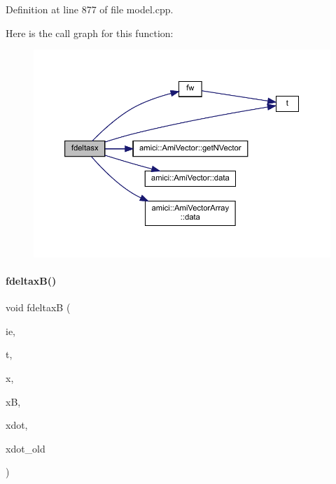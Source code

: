 Definition at line 877 of file model.\+cpp.

Here is the call graph for this function\+:
\nopagebreak
\begin{figure}[H]
\begin{center}
\leavevmode
\includegraphics[width=350pt]{classamici_1_1_model_a685b7374d29d96f7d40d83c7d92fcf27_cgraph}
\end{center}
\end{figure}
\mbox{\label{classamici_1_1_model_a5542077fa03103e502349d92dc95f33a}} 
\paragraph{\texorpdfstring{fdeltax\+B()}{fdeltaxB()}\hspace{0.1cm}{\footnotesize\ttfamily [1/2]}}
{\footnotesize\ttfamily void fdeltaxB (\begin{DoxyParamCaption}\item[{const int}]{ie,  }\item[{const \mbox{\hyperlink{namespaceamici_a1bdce28051d6a53868f7ccbf5f2c14a3}{realtype}}}]{t,  }\item[{const \mbox{\hyperlink{classamici_1_1_ami_vector}{Ami\+Vector}} $\ast$}]{x,  }\item[{const \mbox{\hyperlink{classamici_1_1_ami_vector}{Ami\+Vector}} $\ast$}]{xB,  }\item[{const \mbox{\hyperlink{classamici_1_1_ami_vector}{Ami\+Vector}} $\ast$}]{xdot,  }\item[{const \mbox{\hyperlink{classamici_1_1_ami_vector}{Ami\+Vector}} $\ast$}]{xdot\+\_\+old }\end{DoxyParamCaption})}

